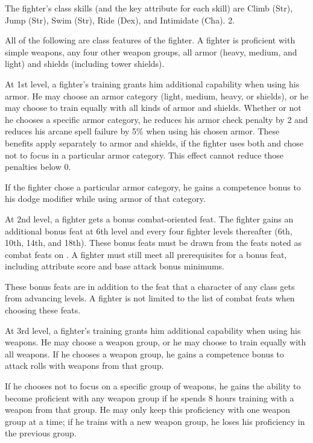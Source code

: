 The fighter's class skills (and the key attribute for each skill) are Climb (Str), Jump (Str), Swim (Str), Ride (Dex), and Intimidate (Cha).
 2.

All of the following are class features of the fighter.
   A fighter is proficient with simple weapons,  any four other weapon groups,  all armor (heavy, medium, and light) and shields (including tower shields).

 At 1st level, a fighter's training grants him additional capability when using his armor. He may choose an armor category (light, medium, heavy, or shields), or he may choose to train equally with all kinds of armor and shields. Whether or not he chooses a specific armor category, he reduces his armor check penalty by 2 and reduces his arcane spell failure by 5\% when using his chosen armor. These benefits apply separately to armor and shields, if the fighter uses both and chose not to focus in a particular armor category. This effect cannot reduce those penalties below 0.
\par If the fighter chose a particular armor category, he gains a  competence bonus to his dodge modifier while using armor of that category.

 At 2nd level, a fighter gets a bonus combat-oriented feat. The fighter gains an additional bonus feat at 6th level and every four fighter levels thereafter (6th, 10th, 14th, and 18th). These bonus feats must be drawn from the feats noted as combat feats on . A fighter must still meet all prerequisites for a bonus feat, including attribute score and base attack bonus minimums.

These bonus feats are in addition to the feat that a character of any class gets from advancing levels. A fighter is not limited to the list of combat feats when choosing these feats.

 At 3rd level, a fighter's training grants him additional capability when using his weapons. He may choose a weapon group, or he may choose to train equally with all weapons. If he chooses a weapon group, he gains a  competence bonus to attack rolls with weapons from that group.
\par If he chooses not to focus on a specific group of weapons, he gains the ability to become proficient with any weapon group if he spends 8 hours training with a weapon from that group. He may only keep this proficiency with one weapon group at a time; if he trains with a new weapon group, he loses his proficiency in the previous group.

